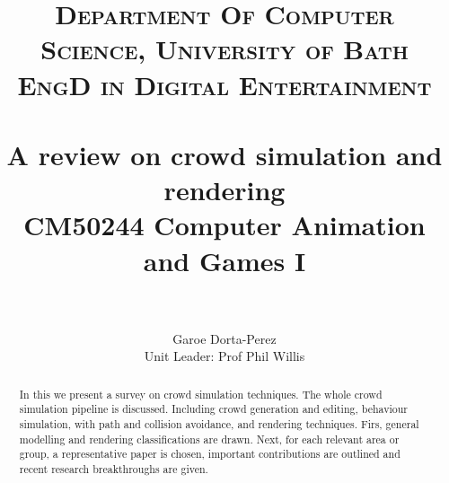 \documentclass[6pt]{article} %
\title{	
\normalfont \normalsize 
\textsc{Department Of Computer Science, University of Bath} \\ [5pt] %
\textsc{EngD in Digital Entertainment} \\ [5pt] 
\horrule{0.7pt} \\[0.2cm] %
\Huge A review on crowd simulation and rendering \\ %
\vspace{7 mm}
\Large CM50244 \: Computer Animation and Games I \\
\horrule{0.7pt} \\[0.0cm] %
}
\author{Garoe Dorta-Perez \\ \Large Unit Leader: Prof Phil Willis \\}  %
\begin{document}
\vspace*{\fill}
\begin{center}
	\begin{minipage}{1.0\textwidth}
		\maketitle %
		\thispagestyle{empty}
	\end{minipage}
\end{center}



\vfill %
\begin{abstract}
\normalsize %
In this we present a survey on crowd simulation techniques.
The whole crowd simulation pipeline is discussed.
Including crowd generation and editing, behaviour simulation, with path and collision avoidance, and rendering techniques.
Firs, general modelling and rendering classifications are drawn.
Next, for each relevant area or group, a representative paper is chosen, important contributions are outlined and recent research breakthroughs are given.
\end{abstract}
\vfill %

\clearpage %

\end{document}
